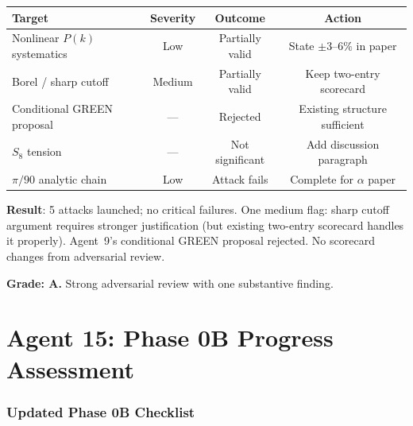 \documentclass[11pt,a4paper]{article}
\begin{document}
\begin{center}
\begin{tabular}{lccc}
\toprule
\textbf{Target} & \textbf{Severity} & \textbf{Outcome} & \textbf{Action} \\
\midrule
Nonlinear $P(k)$ systematics & Low & Partially valid & State $\pm 3$--$6\%$ in paper \\
Borel / sharp cutoff & Medium & Partially valid & Keep two-entry scorecard \\
Conditional GREEN proposal & --- & Rejected & Existing structure sufficient \\
$S_8$ tension & --- & Not significant & Add discussion paragraph \\
$\pi/90$ analytic chain & Low & Attack fails & Complete for $\alpha$ paper \\
\bottomrule
\end{tabular}
\end{center}

\begin{tcolorbox}[colback=green!5!white, colframe=green!60!black, title={Agent 14: Adversarial Attack --- NO CRITICAL FLAGS}]
\textbf{Result}: 5 attacks launched; no critical failures. One medium flag: sharp cutoff argument requires stronger justification (but existing two-entry scorecard handles it properly). Agent~9's conditional GREEN proposal rejected. No scorecard changes from adversarial review.

\textbf{Grade: A.} Strong adversarial review with one substantive finding.
\end{tcolorbox}


\part{Agent 15: Phase 0B Progress Assessment}
\label{part:phase0b}

\section{Updated Phase 0B Checklist}
\end{document}
